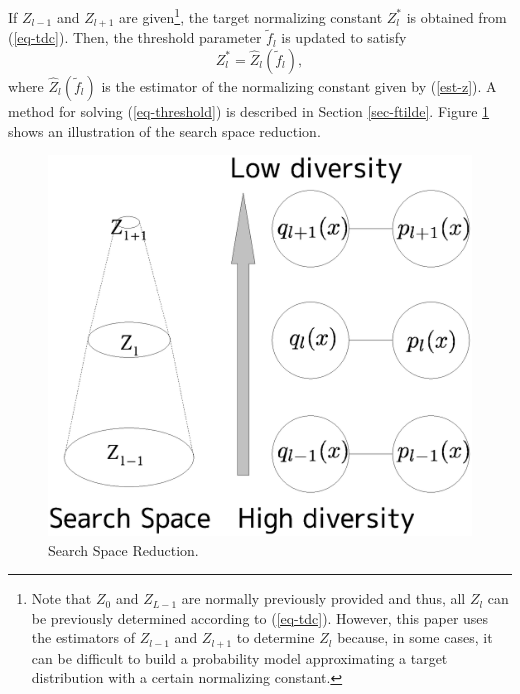 If $Z_{l-1}$ and $Z_{l+1}$ are given\footnote{
Note that $Z_0$ and $Z_{L-1}$ are normally previously provided and thus,
all $Z_l$ can be previously determined according to (\ref{eq-tdc}).
However, this paper uses the estimators of $Z_{l-1}$ and $Z_{l+1}$
to determine $Z_l$ because, in some cases, it can be difficult to 
build a probability model approximating a target distribution with a
certain normalizing constant.},
the target normalizing constant $Z_l^{*}$ is obtained from (\ref{eq-tdc}).
Then, the threshold parameter $\tilde f_l$ is updated to
satisfy 
\begin{equation}
 Z_l^{*}=\hat Z_l(\tilde f_l),
\label{eq-threshold}
\end{equation}
where $\hat Z_l(\tilde f_l)$ is
the estimator of the normalizing constant given by (\ref{est-z}).
A method for solving (\ref{eq-threshold})
is described in Section \ref{sec-ftilde}. 
Figure \ref{search_space} shows an illustration of the
search space reduction.

\begin{figure}[tb]
\centerline{\includegraphics[width=\hfiglength\linewidth]{./data_his/searchspace.eps}}
\caption{Search Space Reduction.}
\label{search_space}
\end{figure}


